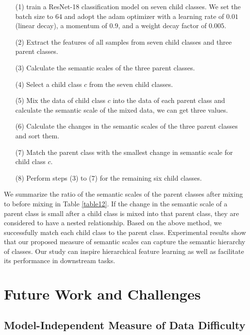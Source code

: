 \documentclass[10pt]{article} %
\begin{document}
\begin{itemize}
     \item[(1)] train a ResNet-18 classification model on seven child classes. We set the batch size to $64$ and adopt the adam optimizer with a learning rate of $0.01$ (linear decay), a momentum of $0.9$, and a weight decay factor of $0.005$.
     \item[(2)] Extract the features of all samples from seven child classes and three parent classes.
     \item[(3)] Calculate the semantic scales of the three parent classes.
     \item[(4)] Select a child class $c$ from the seven child classes.
     \item[(5)] Mix the data of child class $c$ into the data of each parent class and calculate the semantic scale of the mixed data, we can get three values.
     \item[(6)] Calculate the changes in the semantic scales of the three parent classes and sort them.
     \item[(7)] Match the parent class with the smallest change in semantic scale for child class $c$.
     \item[(8)] Perform steps (3) to (7) for the remaining six child classes.
\end{itemize}

We summarize the ratio of the semantic scales of the parent classes after mixing to before mixing in Table \ref{table12}. If the change in the semantic scale of a parent class is small after a child class is mixed into that parent class, they are considered to have a nested relationship. Based on the above method, we successfully match each child class to the parent class. Experimental results show that our proposed measure of semantic scales can capture the semantic hierarchy of classes. Our study can inspire hierarchical feature learning as well as facilitate its performance in downstream tasks.

\section{Future Work and Challenges\label{J}}

\subsection{Model-Independent Measure of Data Difficulty\label{J.1}}
\end{document}
